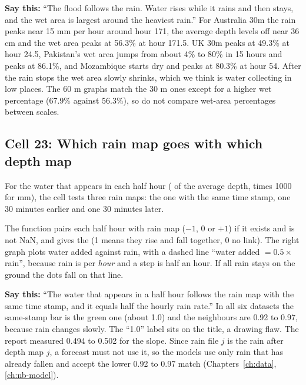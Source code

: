 \textbf{Say this:} ``The flood follows the rain. Water rises while it rains and then stays, and the wet area is largest around the heaviest rain.'' For Australia 30m the rain peaks near 15 mm per hour around hour 171, the average depth levels off near 36 cm and the wet area peaks at 56.3\% at hour 171.5. UK 30m peaks at 49.3\% at hour 24.5, Pakistan's wet area jumps from about 4\% to 80\% in 15 hours and peaks at 86.1\%, and Mozambique starts dry and peaks at 80.3\% at hour 54. After the rain stops the wet area slowly shrinks, which we think is water collecting in low places. The 60 m graphs match the 30 m ones except for a higher wet percentage (67.9\% against 56.3\%), so do not compare wet-area percentages between scales.

\subsection{Cell 23: Which rain map goes with which depth map}
For the water that appears in each half hour ( of the average depth, times 1000 for mm), the cell tests three rain maps: the one with the same time stamp, one 30 minutes earlier and one 30 minutes later.

The function pairs each half hour  with rain map  ($-1$, 0 or $+1$) if it exists and is not NaN, and  gives the  (1 means they rise and fall together, 0 no link). The right graph plots water added against rain, with a dashed line ``water added $=0.5\times$ rain'', because rain is per \emph{hour} and a step is half an hour. If all rain stays on the ground the dots fall on that line.

\textbf{Say this:} ``The water that appears in a half hour follows the rain map with the same time stamp, and it equals half the hourly rain rate.'' In all six datasets the same-stamp bar is the green one (about 1.0) and the neighbours are 0.92 to 0.97, because rain changes slowly. The ``1.0'' label sits on the title, a drawing flaw. The report measured 0.494 to 0.502 for the slope. Since rain file $j$ is the rain after depth map $j$, a forecast must not use it, so the models use only rain that has already fallen and accept the lower 0.92 to 0.97 match (Chapters~\ref{ch:data}, \ref{ch:nb-model}).

